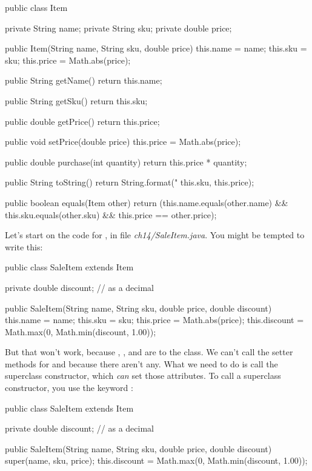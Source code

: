 \begin{code}
public class Item {
    private String name;
    private String sku;
    private double price;
    
    public Item(String name, String sku, double price)  {
        this.name = name;
        this.sku = sku;
        this.price = Math.abs(price);
    }
    
    public String getName() {
        return this.name;
    }
    
    public String getSku() {
        return this.sku;
    }
    
    public double getPrice() {
        return this.price;
    }
    
    public void setPrice(double price) {
        this.price = Math.abs(price);
    }
    
    public double purchase(int quantity) {
        return this.price * quantity;
    }
    
    public String toString() {
        return String.format("%
            this.sku, this.price);
    }
    
    public boolean equals(Item other) {
        return (this.name.equals(other.name) &&
            this.sku.equals(other.sku) &&
            this.price == other.price);
    }
}
\end{code}

Let's start on the code for , in file {\em ch14/SaleItem.java}. You might be tempted to write this:

\begin{code}
public class SaleItem extends Item {
    private double discount; // as a decimal
   
    public SaleItem(String name, String sku, double price,
       double discount)  {
       this.name = name;
       this.sku = sku;
       this.price = Math.abs(price);
       this.discount = Math.max(0,
           Math.min(discount, 1.00));
    }
}
\end{code}

But that won't work, because , , and  are  to the  class.  We can't call the setter methods for  and  because there aren't any. What we need to do is call the superclass constructor, which {\em can} set those attributes.  To call a superclass constructor, you use the keyword :

\begin{code}
public class SaleItem extends Item {
    private double discount; // as a decimal
   
    public SaleItem(String name, String sku, double price,
       double discount)  {
       super(name, sku, price);
       this.discount = Math.max(0,
           Math.min(discount, 1.00));
    }
}
\end{code}


